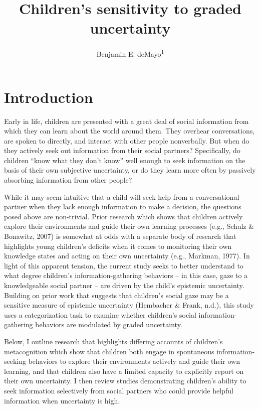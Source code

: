 \documentclass[man]{apa6}
\title{Children's sensitivity to graded uncertainty}
\author{Benjamin E. deMayo\textsuperscript{1}}
\affiliation{
    \vspace{0.5cm}
          \textsuperscript{1} Stanford University  }
\theoremstyle{definition}
\theoremstyle{definition}
\theoremstyle{definition}
\theoremstyle{remark}
\begin{document}
\maketitle

\setcounter{secnumdepth}{0}



\section{Introduction}\label{introduction}

Early in life, children are presented with a great deal of social
information from which they can learn about the world around them. They
overhear conversations, are spoken to directly, and interact with other
people nonverbally. But when do they actively seek out information from
their social partners? Specifically, do children \enquote{know what they
don't know} well enough to seek information on the basis of their own
subjective uncertainty, or do they learn more often by passively
absorbing information from other people?

While it may seem intuitive that a child will seek help from a
conversational partner when they lack enough information to make a
decision, the questions posed above are non-trivial. Prior research
which shows that children actively explore their environments and guide
their own learning processes (e.g., Schulz \& Bonawitz, 2007) is
somewhat at odds with a separate body of research that highlights young
children's deficits when it comes to monitoring their own knowledge
states and acting on their own uncertainty (e.g., Markman, 1977). In
light of this apparent tension, the current study seeks to better
understand to what degree children's information-gathering behaviors --
in this case, gaze to a knowledgeable social partner -- are driven by
the child's epistemic uncertainty. Building on prior work that suggests
that children's social gaze may be a sensitive measure of epistemic
uncertainty (Hembacher \& Frank, n.d.), this study uses a categorization
task to examine whether children's social information-gathering
behaviors are modulated by graded uncertainty.

Below, I outline research that highlights differing accounts of
children's metacognition which show that children both engage in
spontaneous information-seeking behaviors to explore their environments
actively and guide their own learning, and that children also have a
limited capacity to explicitly report on their own uncertainty. I then
review studies demonstrating children's ability to seek information
selectively from social partners who could provide helpful information
when uncertainty is high.
\end{document}
